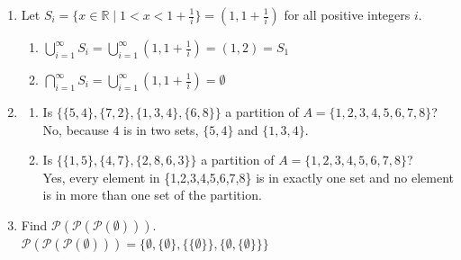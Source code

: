 \documentclass[12pt]{article}
\begin{document}
\begin{enumerate}
	\item Let \( S_i = \{x \in \mathbb{R} \mid 1 < x < 1 + \frac{1}{i}\} = (1, 1+\frac{1}{i}) \) for all positive integers \( i \).
	      \begin{enumerate}
		      \item \( \bigcup\limits_{i=1}^{\infty} S_i = \bigcup\limits_{i=1}^{\infty} (1, 1 + \frac{1}{i}) = (1, 2) = S_1\)
		      \item \( \bigcap\limits_{i=1}^{\infty} S_i = \bigcup\limits_{i=1}^{\infty} (1,1 + \frac{1}{i}) = \emptyset\)
	      \end{enumerate}

	\item
	      \begin{enumerate}
		      \item Is \(\{\{5,4\}, \{7,2\}, \{1,3,4\}, \{6,8\}\}\) a partition of \( A = \{1,2,3,4,5,6,7,8\} \)?\\
		            No, because \(4\) is in two sets, \(\{5,4\}\) and \(\{1,3,4\}\).
		      \item Is \(\{\{1,5\}, \{4,7\}, \{2,8,6,3\}\}\) a partition of \( A = \{1,2,3,4,5,6,7,8\} \)?\\
		            Yes, every element in \{1,2,3,4,5,6,7,8\} is in exactly one set and no element is in more than one set of the partition.
	      \end{enumerate}

	\item Find \( \mathcal{P}(\mathcal{P}(\mathcal{P}(\emptyset))) \).\\
	      \(\mathcal{P}(\mathcal{P}(\mathcal{P}(\emptyset))) = \{\emptyset, \{\emptyset\}, \{\{\emptyset\}\}, \{\emptyset, \{\emptyset\}\}\}\)


\end{enumerate}
\end{document}
